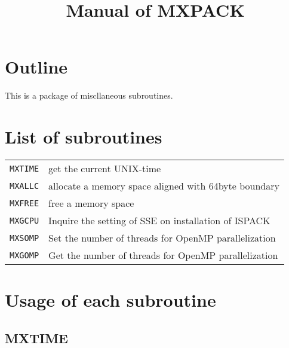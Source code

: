 \documentclass[a4paper]{scrartcl}
\title{Manual of MXPACK}
\author{}
\date{}
\begin{document}
\maketitle

\section{Outline}

This is a package of miscllaneous subroutines.


\section{List of subroutines}

\vspace{1em}
\begin{tabular}{ll}
\texttt{MXTIME} & get the current UNIX-time\\
\texttt{MXALLC} & allocate a memory space aligned with 64byte boundary\\
\texttt{MXFREE} & free a memory space\\
\texttt{MXGCPU} & Inquire the setting of SSE on installation of ISPACK\\
\texttt{MXSOMP} & Set the number of threads for OpenMP parallelization\\
\texttt{MXGOMP} & Get the number of threads for OpenMP parallelization
\end{tabular}


\section{Usage of each subroutine}

\subsection{MXTIME}
\end{document}
